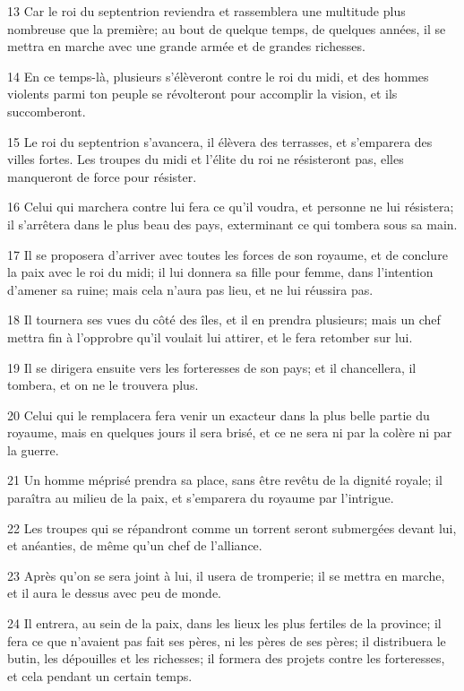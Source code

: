 \par 13 Car le roi du septentrion reviendra et rassemblera une multitude plus nombreuse que la première; au bout de quelque temps, de quelques années, il se mettra en marche avec une grande armée et de grandes richesses.
\par 14 En ce temps-là, plusieurs s'élèveront contre le roi du midi, et des hommes violents parmi ton peuple se révolteront pour accomplir la vision, et ils succomberont.
\par 15 Le roi du septentrion s'avancera, il élèvera des terrasses, et s'emparera des villes fortes. Les troupes du midi et l'élite du roi ne résisteront pas, elles manqueront de force pour résister.
\par 16 Celui qui marchera contre lui fera ce qu'il voudra, et personne ne lui résistera; il s'arrêtera dans le plus beau des pays, exterminant ce qui tombera sous sa main.
\par 17 Il se proposera d'arriver avec toutes les forces de son royaume, et de conclure la paix avec le roi du midi; il lui donnera sa fille pour femme, dans l'intention d'amener sa ruine; mais cela n'aura pas lieu, et ne lui réussira pas.
\par 18 Il tournera ses vues du côté des îles, et il en prendra plusieurs; mais un chef mettra fin à l'opprobre qu'il voulait lui attirer, et le fera retomber sur lui.
\par 19 Il se dirigera ensuite vers les forteresses de son pays; et il chancellera, il tombera, et on ne le trouvera plus.
\par 20 Celui qui le remplacera fera venir un exacteur dans la plus belle partie du royaume, mais en quelques jours il sera brisé, et ce ne sera ni par la colère ni par la guerre.
\par 21 Un homme méprisé prendra sa place, sans être revêtu de la dignité royale; il paraîtra au milieu de la paix, et s'emparera du royaume par l'intrigue.
\par 22 Les troupes qui se répandront comme un torrent seront submergées devant lui, et anéanties, de même qu'un chef de l'alliance.
\par 23 Après qu'on se sera joint à lui, il usera de tromperie; il se mettra en marche, et il aura le dessus avec peu de monde.
\par 24 Il entrera, au sein de la paix, dans les lieux les plus fertiles de la province; il fera ce que n'avaient pas fait ses pères, ni les pères de ses pères; il distribuera le butin, les dépouilles et les richesses; il formera des projets contre les forteresses, et cela pendant un certain temps.
